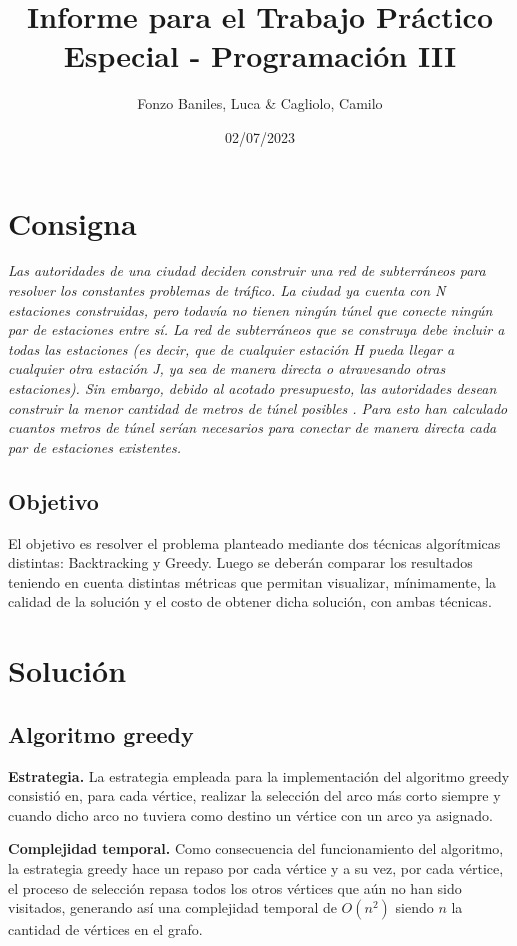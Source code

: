 \documentclass[10 pt, A4paper]{article}
\title{Informe para el Trabajo Práctico Especial - Programación III}
\author{Fonzo Baniles, Luca \& Cagliolo, Camilo}
\date{02/07/2023}
\begin{document}
	\maketitle
	\section*{Consigna}
	\begin{displayquote}
		\textit{Las autoridades de una ciudad deciden construir una red de subterráneos para resolver los constantes problemas de tráfico. La ciudad ya cuenta con N estaciones construidas, pero todavía no tienen ningún túnel que conecte ningún par de estaciones entre sí. La red de subterráneos que se construya debe incluir a todas las estaciones (es decir, que de cualquier estación H pueda llegar a cualquier otra estación J, ya sea de manera directa o atravesando otras estaciones). Sin embargo, debido al acotado presupuesto, las autoridades desean construir la menor cantidad de metros de túnel posibles . Para esto han calculado cuantos metros de túnel serían necesarios para conectar de manera directa cada par de estaciones existentes.}
	\end{displayquote}
	\subsection*{Objetivo}
	El objetivo es resolver el problema planteado mediante dos técnicas algorítmicas distintas: Backtracking y Greedy. Luego se deberán comparar los resultados teniendo en cuenta distintas métricas que permitan visualizar, mínimamente, la calidad de la solución y el costo de obtener dicha solución, con ambas técnicas.
	\section*{Solución}
	\subsection*{Algoritmo greedy}
	
	\textbf{Estrategia.} La estrategia empleada para la implementación del algoritmo greedy consistió en, para cada vértice, realizar la selección del arco más corto siempre y cuando dicho arco no tuviera como destino un vértice con un arco ya asignado.
	
	\noindent\textbf{Complejidad temporal.} Como consecuencia del funcionamiento del algoritmo, la estrategia greedy hace un repaso por cada vértice y a su vez, por cada vértice, el proceso de selección repasa todos los otros vértices que aún no han sido visitados, generando así una complejidad temporal de $O(n^2)$ siendo $n$ la cantidad de vértices en el grafo.
	
\end{document}
